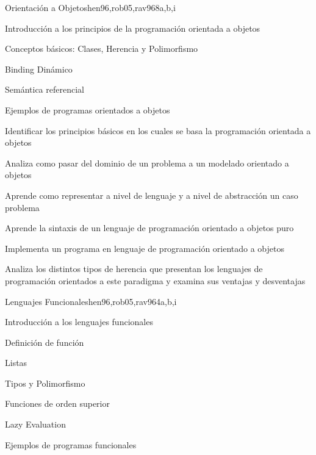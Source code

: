 \begin{syllabus}
\begin{unit}{Orientación a Objetos}{hen96,rob05,rav96}{8}{a,b,i}
\begin{topics}
      \item Introducción a los principios de la programación orientada a objetos
      \item Conceptos básicos: Clases, Herencia y Polimorfismo
      \item Binding Dinámico
      \item Semántica referencial
      \item Ejemplos de programas orientados a objetos
   \end{topics}

   \begin{unitgoals}
      \item Identificar los principios básicos en los cuales se basa la programación orientada a objetos
      \item Analiza como pasar del dominio de un problema a un modelado orientado a objetos
      \item Aprende como representar a nivel de lenguaje y a nivel de abstracción un caso problema
      \item Aprende la sintaxis de un lenguaje de programación orientado a objetos puro
      \item Implementa un programa en lenguaje de programación orientado a objetos
      \item Analiza los distintos tipos de herencia que presentan los lenguajes de programación orientados a este paradigma y examina sus ventajas y desventajas
   \end{unitgoals}
\end{unit}

\begin{unit}{Lenguajes Funcionales}{hen96,rob05,rav96}{4}{a,b,i}
\begin{topics}
    \item Introducción a los lenguajes funcionales
      \item Definición de función
      \item Listas
      \item Tipos y Polimorfismo
      \item Funciones de orden superior
      \item Lazy Evaluation
      \item Ejemplos de programas funcionales
   \end{topics}


\end{unit}
\end{syllabus}
